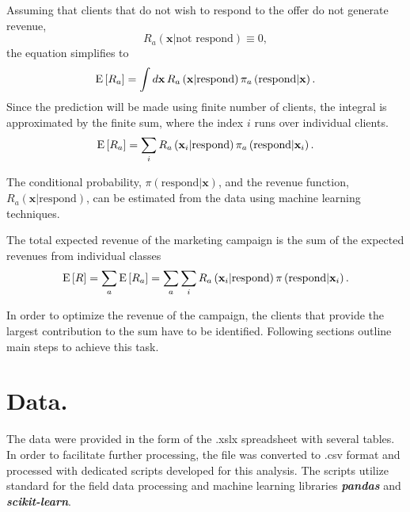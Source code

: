 \documentclass[14pt]{scrartcl}
\begin{document}
Assuming that clients that do not wish to respond to the offer do not
generate revenue, 
\begin{equation}
    R_a(\textbf{x}|\textrm{not respond}) \equiv 0,
\end{equation} 
the equation simplifies to
\begin{equation}
    \textmd{E}\left[R_a\right] =  \int d\mathbf{x}\,R_a \left( \textbf{x}|\textrm{respond} \right) 
                                       \pi_{a}\left(\textrm{respond}|\textbf{x}\right).
\end{equation}
Since the prediction will be made using finite number of clients, the integral
is approximated by the finite sum, where the index $i$ runs over individual clients.
\begin{equation}
    \textmd{E}\left[R_a\right] =  \sum_i R_a \left( \textbf{x}_{i}|\textrm{respond} \right) 
                                        \pi_{a}\left(\textrm{respond}|\textbf{x}_{i}\right).
\end{equation}

The conditional probability, $\pi\left(\textrm{respond}|\textbf{x}\right)$, 
and the revenue function, $R_a \left( \textbf{x}|\textrm{respond} \right)$, 
can be estimated from the data using machine learning techniques.

The total expected revenue of the marketing campaign is the sum of the
expected revenues from individual classes
\begin{equation}
    \textmd{E}\left[R\right] = \sum_a \textmd{E}\left[R_a\right] = \sum_a \sum_i R_a \left( \textbf{x}_{i}|\textrm{respond} \right) 
    \pi\left(\textrm{respond}|\textbf{x}_{i}\right).
    \label{eq:final}
\end{equation}

In order to optimize the revenue of the campaign, the clients that provide the largest
contribution to the sum have to be identified. Following sections outline main 
steps to achieve this task.

\section{Data.}\label{sec:data}
The data were provided in the form of the .xslx spreadsheet with several tables.
In order to facilitate further processing, the file was converted to .csv format
and processed with dedicated scripts developed for this analysis.
The scripts utilize standard for the field data processing and machine learning 
libraries \textbf{\textsl{pandas}} and \textbf{\textsl{scikit-learn}}.
\end{document}
